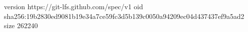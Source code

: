 version https://git-lfs.github.com/spec/v1
oid sha256:19b2830ed9081b19e34a7ce59fc3d5b139c0050a94209ec04d437437ef9a5ad2
size 262240
